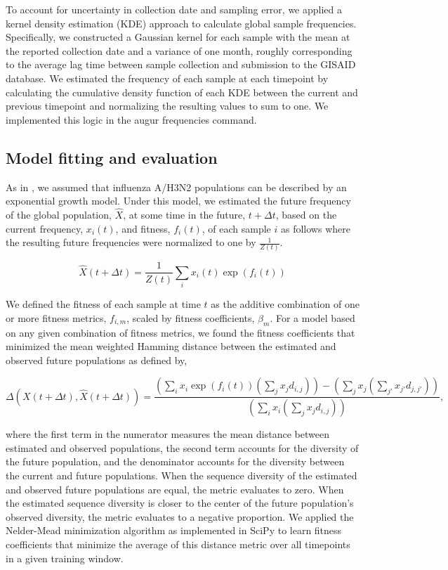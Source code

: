 To account for uncertainty in collection date and sampling error, we applied a kernel density estimation (KDE) approach to calculate global sample frequencies.
Specifically, we constructed a Gaussian kernel for each sample with the mean at the reported collection date and a variance of one month, roughly corresponding to the average lag time between sample collection and submission to the GISAID database.
We estimated the frequency of each sample at each timepoint by calculating the cumulative density function of each KDE between the current and previous timepoint and normalizing the resulting values to sum to one.
We implemented this logic in the augur frequencies command.

\subsection*{Model fitting and evaluation}

As in \cite{Luksza:2014hj}, we assumed that influenza A/H3N2 populations can be described by an exponential growth model.
Under this model, we estimated the future frequency of the global population, $\hat{X}$, at some time in the future, $t + \Delta{t}$, based on the current frequency, $x_{i}(t)$, and fitness, $f_{i}(t)$, of each sample $i$ as follows where the resulting future frequencies were normalized to one by $\frac{1}{Z(t)}$.

$$
\hat{X}(t + \Delta{t}) = \frac{1}{Z(t)}\sum_{i}x_{i}(t)\exp(f_{i}(t))
$$

We defined the fitness of each sample at time $t$ as the additive combination of one or more fitness metrics, $f_{i,m}$, scaled by fitness coefficients, $\beta_{m}$.
For a model based on any given combination of fitness metrics, we found the fitness coefficients that minimized the mean weighted Hamming distance between the estimated and observed future populations as defined by,

$$
\Delta(X(t + \Delta{t}), \hat{X}(t + \Delta{t})) = \frac{(\sum_{i}x_{i}\exp(f_{i}(t))(\sum_{j}x_{j}d_{i,j})) - (\sum_{j}x_{j}(\sum_{j'}x_{j'}d_{j,j'}))}{(\sum_{i}x_{i}(\sum_{j}x_{j}d_{i,j}))},
$$

where the first term in the numerator measures the mean distance between estimated and observed populations, the second term accounts for the diversity of the future population, and the denominator accounts for the diversity between the current and future populations.
When the sequence diversity of the estimated and observed future populations are equal, the metric evaluates to zero.
When the estimated sequence diversity is closer to the center of the future population's observed diversity, the metric evaluates to a negative proportion.
We applied the Nelder-Mead minimization algorithm as implemented in SciPy \cite{SciPy} to learn fitness coefficients that minimize the average of this distance metric over all timepoints in a given training window.

